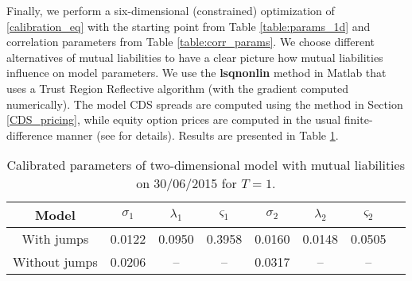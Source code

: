 Finally, we perform a six-dimensional (constrained) optimization of \eqref{calibration_eq} with the starting point from Table \ref{table:params_1d} and correlation parameters from Table \ref{table:corr_params}. We choose different alternatives of mutual liabilities to have a clear picture how mutual liabilities influence on model parameters. We use the {\bf lsqnonlin} method in Matlab that uses a Trust Region Reflective algorithm \cite{conn2000trust} (with the gradient computed numerically). The model CDS spreads are computed using the method in Section \ref{CDS_pricing}, while equity option prices are computed in the usual finite-difference manner (see \cite{LiptonSepp} for details).  Results are presented in Table \ref{table:params_2d}.

\begin{table}[H]
	\begin{center}
		\begin{tabular}{|c | c | c | c | c | c | c | c |}
			\hline
			 Model & $\sigma_1$ & $\lambda_1$ & $\varsigma_1$ & $\sigma_2$ & $\lambda_2$ & $\varsigma_2$  \\ 
			\hline
			With jumps & 0.0122&  0.0950& 0.3958& 0.0160 & 0.0148 & 0.0505 \\
			Without jumps & 0.0206 & -- & -- & 0.0317 & -- & -- \\
			\hline
		\end{tabular}
		\caption{Calibrated parameters of two-dimensional model with mutual liabilities on 30/06/2015 for $T = 1$.}
		\label{table:params_2d}	
	\end{center}
\end{table}

